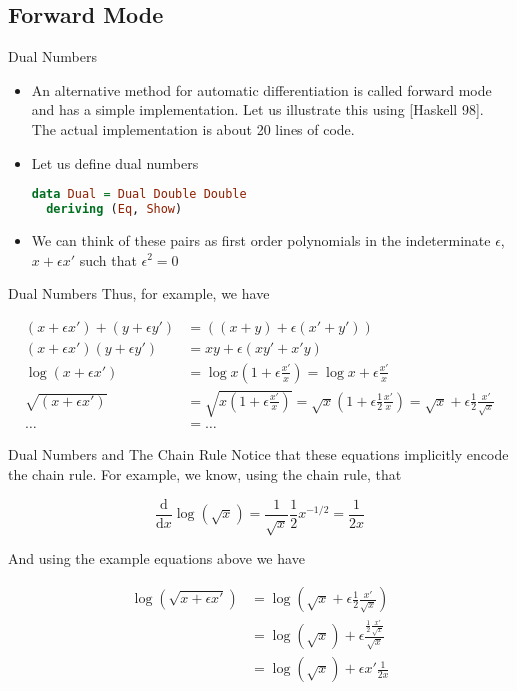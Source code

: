 \documentclass{beamer}
\begin{document}
\subsection{Forward Mode}

\begin{frame}[fragile]{Dual Numbers}
\begin{itemize}
\item
An alternative method for automatic differentiation is called forward
mode and has a simple implementation. Let us illustrate this using
[Haskell 98]. The actual implementation is about 20 lines of code.
\item
Let us define dual numbers

\begin{lstlisting}[language=Haskell]
data Dual = Dual Double Double
  deriving (Eq, Show)
\end{lstlisting}
\item
We can think of these pairs as first order polynomials in the
indeterminate $\epsilon$, $x + \epsilon x'$ such that $\epsilon^2 = 0$
\end{itemize}
\end{frame}

\begin{frame}[fragile]{Dual Numbers}
Thus, for example, we have

$$
\begin{aligned}
(x + \epsilon x') + (y + \epsilon y') &= ((x + y) + \epsilon (x' + y')) \\
(x + \epsilon x')(y + \epsilon y') &= xy + \epsilon (xy' + x'y) \\
\log (x + \epsilon x') &=
\log x (1 + \epsilon \frac {x'}{x}) =
\log x + \epsilon\frac{x'}{x} \\
\sqrt{(x + \epsilon x')} &=
\sqrt{x(1 + \epsilon\frac{x'}{x})} =
\sqrt{x}(1 + \epsilon\frac{1}{2}\frac{x'}{x}) =
\sqrt{x} + \epsilon\frac{1}{2}\frac{x'}{\sqrt{x}} \\
\ldots &= \ldots
\end{aligned}
$$
\end{frame}

\begin{frame}[fragile]{Dual Numbers and The Chain Rule}
Notice that these equations implicitly encode the chain rule. For
example, we know, using the chain rule, that

$$
\frac{\mathrm{d}}{\mathrm{d} x}\log(\sqrt x) =
\frac{1}{\sqrt x}\frac{1}{2}x^{-1/2} =
\frac{1}{2x}
$$

And using the example equations above we have

$$
\begin{aligned}
\log(\sqrt {x + \epsilon x'}) &= \log (\sqrt{x} + \epsilon\frac{1}{2}\frac{x'}{\sqrt{x}}) \\
                              &= \log (\sqrt{x}) + \epsilon\frac{\frac{1}{2}\frac{x'}{\sqrt{x}}}{\sqrt{x}} \\
                              &= \log (\sqrt{x}) + \epsilon x'\frac{1}{2x}
\end{aligned}
$$
\end{frame}
\end{document}
